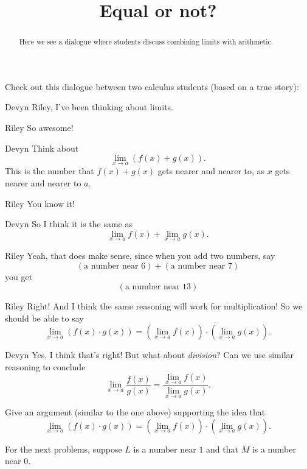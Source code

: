 \documentclass{ximera}
\title[Break-Ground:]{Equal or not?}
\begin{document}
\begin{abstract}
Here we see a dialogue where students discuss combining limits with
arithmetic.
\end{abstract}
\maketitle


Check out this dialogue between two calculus students (based on a true
story):

\begin{dialogue}
\item[Devyn] Riley, I've been thinking about limits.
\item[Riley] So awesome!
\item[Devyn] Think about
  \[
  \lim_{x\to a} \left(f(x) + g(x)\right).
  \]
  This is the number that $f(x) + g(x)$ gets nearer and nearer to, as $x$ gets nearer and nearer to $a$. 
\item[Riley] You know it!
\item[Devyn] So I think it is the same as
  \[
  \lim_{x\to a} f(x) + \lim_{x\to a}g(x).
  \]
\item[Riley] Yeah, that does make sense, since when you add two
  numbers, say
  \[
  (\text{a number near $6$}) + (\text{a number near $7$})
  \]
  you get
  \[
  (\text{a number near $13$})
  \]
\item[Riley] Right! And I think the same reasoning will work for
  multiplication! So we should be able to say
  \[
  \lim_{x\to a}\left(f(x) \cdot g(x)\right) = \left(\lim_{x\to a} f(x) \right)\cdot\left(\lim_{x\to a} g(x)\right).
  \]
\item[Devyn] Yes, I think that's right! But what about
  \textit{division}? Can we use similar reasoning to conclude
  \[
  \lim_{x\to a} \frac{f(x)}{g(x)} = \frac{\lim_{x\to a}
    f(x)}{\lim_{x\to a} g(x)}.
  \]
\end{dialogue}



\begin{problem}
  Give an argument (similar to the one above) supporting the idea that
  \[
  \lim_{x\to a}\left(f(x) \cdot g(x)\right) = \left(\lim_{x\to a} f(x) \right)\cdot\left(\lim_{x\to a} g(x)\right).
  \]
  \begin{freeResponse}
  \end{freeResponse}
\end{problem}


For the next problems, suppose $L$ is a number near $1$ and that $M$
is a number near $0$.
\end{document}
